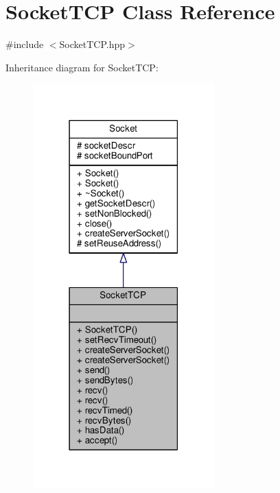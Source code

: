 \hypertarget{class_socket_t_c_p}{\section{Socket\-T\-C\-P Class Reference}
\label{class_socket_t_c_p}
}


{\ttfamily \#include $<$Socket\-T\-C\-P.\-hpp$>$}



Inheritance diagram for Socket\-T\-C\-P\-:
\nopagebreak
\begin{figure}[H]
\begin{center}
\leavevmode
\includegraphics[width=198pt]{class_socket_t_c_p__inherit__graph}
\end{center}
\end{figure}


